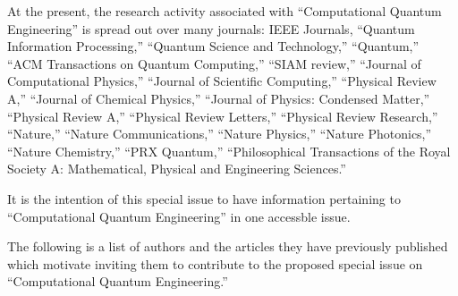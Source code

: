 \documentclass[]{article}
\begin{document}
\begin{comment}

Explains how the anticipated contribution of the special issue will advance understanding in this area;

\end{comment}

At the present, the research activity associated with ``Computational Quantum Engineering''
is spread out over many journals: IEEE Journals, 
``Quantum Information Processing,'' 
``Quantum Science and Technology,'' 
``Quantum,'' 
``ACM Transactions on Quantum Computing,''
``SIAM review,''
``Journal of Computational Physics,''
``Journal of Scientific Computing,''
``Physical Review A,'' 
``Journal of Chemical Physics,'' 
``Journal of Physics: Condensed Matter,''
``Physical Review A,''
``Physical Review Letters,''
``Physical Review Research,''
``Nature,''
``Nature Communications,''
``Nature Physics,''
``Nature Photonics,''
``Nature Chemistry,''
``PRX Quantum,''
``Philosophical Transactions of the Royal Society A: Mathematical, Physical and Engineering Sciences.''

It is the intention of this special issue to have information pertaining
to ``Computational Quantum Engineering'' in one accessble issue.

\begin{comment}

Identifies papers and authors for possible inclusion in the special issue, with a brief description of each paper. (These papers do not need to have been written at this time, although it might be the case that work is already in progress.);

\end{comment}


The following is a list of authors and the articles they
have previously published which motivate inviting them to 
contribute to the proposed special issue on ``Computational
Quantum Engineering.''
\end{document}
